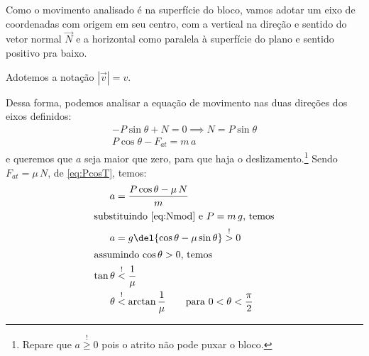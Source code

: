 \documentclass[]{IMTexam}
\begin{document}
\begin{questions}
\begin{solution}
		\begin{unindent}
			\item Como o movimento analisado é na superfície do bloco, vamos adotar um eixo de coordenadas com origem em seu centro, com a vertical na direção e sentido do vetor normal $ \vec{N} $ e a horizontal como paralela à superfície do plano e sentido positivo pra baixo.

			Adotemos a notação $ |\vec{v}|=v $.

			Dessa forma, podemos analisar a equação de movimento nas duas direções dos eixos definidos:
			\begin{gather}
				-P\sin\theta+N=0\implies N=P\sin\theta\label{eq:Nmod}\\
				P\cos\theta-F_{at}=m\,a\label{eq:PcosT}
			\end{gather}
			e queremos que $ a $ seja maior que zero, para que haja o deslizamento.\footnote{Repare que $ a\stackrel{!}{\geqslant}0 $ pois o atrito não pode puxar o bloco.} Sendo $ F_{at}=\mu\,N $, de \ref{eq:PcosT}, temos:
			\begin{align*}
				a          & =\dfrac{P\cos\theta-\mu\,N}{m}                                                    \\
				\intertext{substituindo \ref{eq:Nmod} e $ P=m\,g $, temos}
				a          & =g\del{\cos\theta-\mu\sin\theta}\stackrel{!}{>}0                                  \\
				\intertext{assumindo $ \cos\theta>0 $, temos}
				\tan\theta & \stackrel{!}{<}\dfrac{1}{\mu}                                                     \\
				\theta     & \stackrel{!}{<}\arctan\dfrac{1}{\mu}\qquad\text{para $ 0<\theta<\dfrac{\pi}{2} $}
			\end{align*}
		\end{unindent}

	\end{solution}

\end{questions}

\clearpage

\appendix
\end{document}
